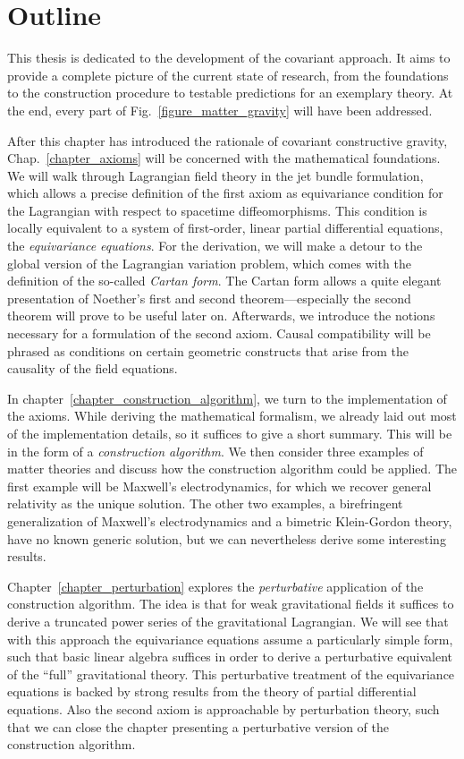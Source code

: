 \section{Outline}

This thesis is dedicated to the development of the covariant approach. It aims to provide a complete picture of the current state of research, from the foundations to the construction procedure to testable predictions for an exemplary theory. At the end, every part of Fig.~\ref{figure_matter_gravity} will have been addressed.

After this chapter has introduced the rationale of covariant constructive gravity, Chap.~\ref{chapter_axioms} will be concerned with the mathematical foundations. We will walk through Lagrangian field theory in the jet bundle formulation, which allows a precise definition of the first axiom as equivariance condition for the Lagrangian with respect to spacetime diffeomorphisms. This condition is locally equivalent to a system of first-order, linear partial differential equations, the \emph{equivariance equations}. For the derivation, we will make a detour to the global version of the Lagrangian variation problem, which comes with the definition of the so-called \emph{Cartan form}. The Cartan form allows a quite elegant presentation of Noether's first and second theorem---especially the second theorem will prove to be useful later on. Afterwards, we introduce the notions necessary for a formulation of the second axiom. Causal compatibility will be phrased as conditions on certain geometric constructs that arise from the causality of the field equations.

In chapter~\ref{chapter_construction_algorithm}, we turn to the implementation of the axioms. While deriving the mathematical formalism, we already laid out most of the implementation details, so it suffices to give a short summary. This will be in the form of a \emph{construction algorithm}. We then consider three examples of matter theories and discuss how the construction algorithm could be applied. The first example will be Maxwell's electrodynamics, for which we recover general relativity as the unique solution. The other two examples, a birefringent generalization of Maxwell's electrodynamics and a bimetric Klein-Gordon theory, have no known generic solution, but we can nevertheless derive some interesting results.

Chapter~\ref{chapter_perturbation} explores the \emph{perturbative} application of the construction algorithm. The idea is that for weak gravitational fields it suffices to derive a truncated power series of the gravitational Lagrangian. We will see that with this approach the equivariance equations assume a particularly simple form, such that basic linear algebra suffices in order to derive a perturbative equivalent of the ``full'' gravitational theory. This perturbative treatment of the equivariance equations is backed by strong results from the theory of partial differential equations. Also the second axiom is approachable by perturbation theory, such that we can close the chapter presenting a perturbative version of the construction algorithm.


